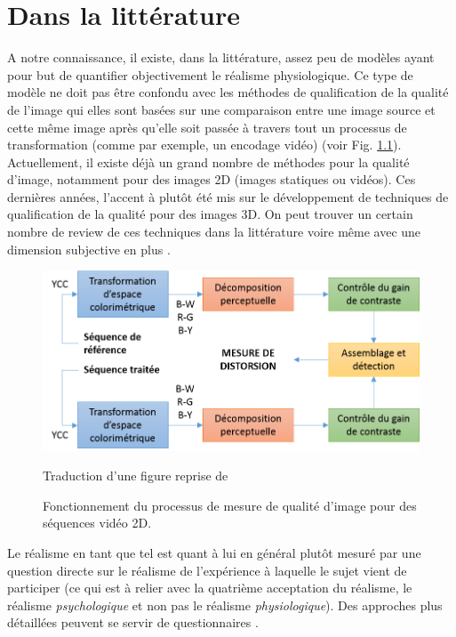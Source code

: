 \chapter{Dans la littérature}	
\par A notre connaissance, il existe, dans la littérature, assez peu de modèles ayant pour but de quantifier objectivement le réalisme physiologique. Ce type de modèle ne doit pas être confondu avec les méthodes de qualification de la qualité de l'image qui elles sont basées sur une comparaison entre une image source et cette même image après qu'elle soit passée à travers tout un processus de transformation (comme par exemple, un encodage vidéo) \citep{cadik_human_2004, winkler_quality_2000} (voir Fig. \ref{fig:quality_process}). Actuellement, il existe déjà un grand nombre de méthodes pour la qualité d'image, notamment pour des images 2D (images statiques ou vidéos). Ces dernières années, l'accent à plutôt été mis sur le développement de techniques de qualification de la qualité pour des images 3D. On peut trouver un certain nombre de review de ces techniques dans la littérature \citep{moorthy_subjective_2013, moorthy_survey_2013} voire même avec une dimension subjective en plus \citep{beghdadi_survey_2013}.
	
	\begin{figure}
		\centering
		\includegraphics[scale=1]{Figures/ImageQualityWinkler}
		\caption{Fonctionnement du processus de mesure de qualité d'image pour des séquences vidéo 2D.}{Traduction d'une figure reprise de \cite{winkler_quality_2000}}
		\label{fig:quality_process}
	\end{figure}
	
	\par Le réalisme en tant que tel est quant à lui en général plutôt mesuré par une question directe sur le réalisme de l'expérience à laquelle le sujet vient de participer (ce qui est à relier avec la quatrième acceptation du réalisme, le réalisme \textit{psychologique} et non pas le réalisme \textit{physiologique}). Des approches plus détaillées peuvent se servir de questionnaires \citep{fucentese_evaluation_2015, fiard_initial_2014}.
	
